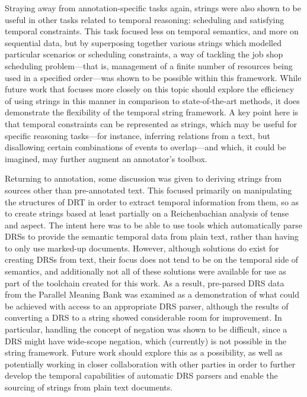 \documentclass[a4paper,12pt,leqno]{article}
\begin{document}
Straying away from annotation-specific tasks again, strings were also shown to be useful in other tasks related to temporal reasoning: scheduling and satisfying temporal constraints. This task focused less on temporal semantics, and more on sequential data, but by superposing together various strings which modelled particular scenarios or scheduling constraints, a way of tackling the job shop scheduling problem---that is, management of a finite number of resources being used in a specified order---was shown to be possible within this framework. While future work that focuses more closely on this topic should explore the efficiency of using strings in this manner in comparison to state-of-the-art methods, it does demonstrate the flexibility of the temporal string framework. A key point here is that temporal constraints can be represented as strings, which may be useful for specific reasoning tasks---for instance, inferring relations from a text, but disallowing certain combinations of events to overlap---and which, it could be imagined, may further augment an annotator's toolbox.

Returning to annotation, some discussion was given to deriving strings from sources other than pre-annotated text. This focused primarily on manipulating the structures of DRT in order to extract temporal information from them, so as to create strings based at least partially on a Reichenbachian analysis of tense and aspect. The intent here was to be able to use tools which automatically parse DRSs to provide the semantic temporal data from plain text, rather than having to only use marked-up documents. However, although solutions do exist for creating DRSs from text, their focus does not tend to be on the temporal side of semantics, and additionally not all of these solutions were available for use as part of the toolchain created for this work. As a result, pre-parsed DRS data from the Parallel Meaning Bank was examined as a demonstration of what could be achieved with access to an appropriate DRS parser, although the results of converting a DRS to a string showed considerable room for improvement. In particular, handling the concept of negation was shown to be difficult, since a DRS might have wide-scope negation, which (currently) is not possible in the string framework. Future work should explore this as a possibility, as well as potentially working in closer collaboration with other parties in order to further develop the temporal capabilities of automatic DRS parsers and enable the sourcing of strings from plain text documents.
\end{document}
